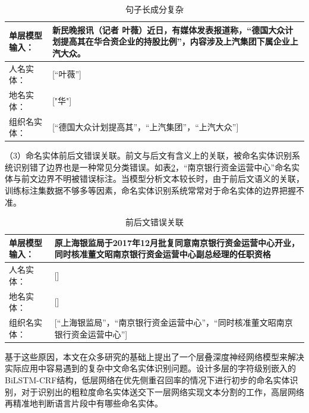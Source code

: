 \documentclass[winfonts,master,oneside,nobackinfo]{njuthesis}
\begin{document}
\begin{table}[h]
\centering
\begin{tabularx}{0.95\textwidth}{|l|X|}
\hline
单层模型输入： & 新民晚报讯（记者 叶薇）近日，有媒体发表报道称，“德国大众计划提高其在华合资企业的持股比例”，内容涉及上汽集团下属企业上汽大众。 \\ \hline
人名实体：         & {[}“叶薇”{]}                                                       \\ \hline
地名实体：         & {[}"华"{]}                                                        \\ \hline
组织名实体：        & {[}“德国大众计划提高其”，“上汽集团”，“上汽大众”{]}  \\ \hline
\end{tabularx}
\caption{句子长成分复杂}
\label{long}
\end{table}


（3）命名实体前后文错误关联。前文与后文有含义上的关联，被命名实体识别系统识别错了边界也是一种常见分类错误。如表\ref{mix}，“南京银行资金运营中心”命名实体与前文边界不明被错误标注。当模型分析文本较长时，由于前后文语义的关联，训练标注集数据不够多等因素，命名实体识别系统常常对于命名实体的边界把握不准。


\begin{table}[h]
\centering
\begin{tabularx}{0.95\textwidth}{|l|X|}
\hline
单层模型输入： & 原上海银监局于2017年12月批复同意南京银行资金运营中心开业，同时核准董文昭南京银行资金运营中心副总经理的任职资格 \\ \hline
人名实体：             & {[}{]}                                                           \\ \hline
地名实体：             & {[}{]}                                                           \\ \hline
组织名实体：            & {[}“上海银监局”，“南京银行资金运营中心”，“同时核准董文昭南京银行资金运营中心”{]}                   \\ \hline
\end{tabularx}
\caption{前后文错误关联}
\label{mix}
\end{table}



基于这些原因，本文在众多研究的基础上提出了一个层叠深度神经网络模型来解决实际应用中容易遇到的复杂中文命名实体识别问题。设计多层的字符级别嵌入的BiLSTM-CRF结构，低层网络在优先侧重召回率的情况下进行初步的命名实体识别，对于识别出的粗粒度命名实体送交下一层网络实现文本分割的工作，高层网络再精准地判断语言片段中有哪些命名实体。
\end{document}
